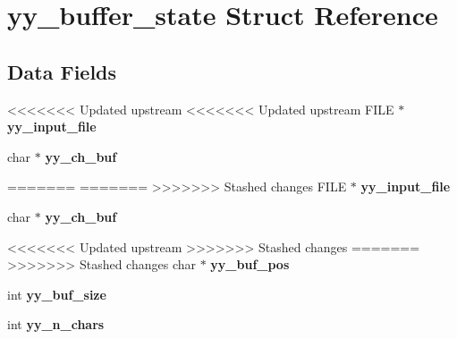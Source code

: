 \hypertarget{structyy__buffer__state}{}\section{yy\+\_\+buffer\+\_\+state Struct Reference}
\label{structyy__buffer__state}
\subsection*{Data Fields}
\begin{DoxyCompactItemize}
\item 
<<<<<<< Updated upstream
<<<<<<< Updated upstream
\mbox{\label{structyy__buffer__state_afb2a40bf9a1b84be81d8e8c0bbcbee21}} 
F\+I\+LE $\ast$ {\bfseries yy\+\_\+input\+\_\+file}
\item 
\mbox{\label{structyy__buffer__state_af61a9e79f8fc1edb3ae8a2fa2952ce22}} 
char $\ast$ {\bfseries yy\+\_\+ch\+\_\+buf}
\item 
\mbox{\label{structyy__buffer__state_ae8850ab3d90f9339c392020e7d83c4c7}} 
=======
=======
>>>>>>> Stashed changes
\mbox{\label{structyy__buffer__state_aae49f75f50cbf473db7ba7a6134b9a6a}} 
F\+I\+LE $\ast$ {\bfseries yy\+\_\+input\+\_\+file}
\item 
\mbox{\label{structyy__buffer__state_ab8c1fb056870dfcc59768bca4e988cdd}} 
char $\ast$ {\bfseries yy\+\_\+ch\+\_\+buf}
\item 
\mbox{\label{structyy__buffer__state_afd1af9e284d7c432400835e417d85ee8}} 
<<<<<<< Updated upstream
>>>>>>> Stashed changes
=======
>>>>>>> Stashed changes
char $\ast$ {\bfseries yy\+\_\+buf\+\_\+pos}
\item 
\mbox{\label{structyy__buffer__state_ae404f23e6786820b0213464ffcf9fd03}} 
int {\bfseries yy\+\_\+buf\+\_\+size}
\item 
\mbox{\label{structyy__buffer__state_aa86c122f2050dbfd365fcf547e6fc1c3}} 
int {\bfseries yy\+\_\+n\+\_\+chars}
\item 

\end{DoxyCompactItemize}
